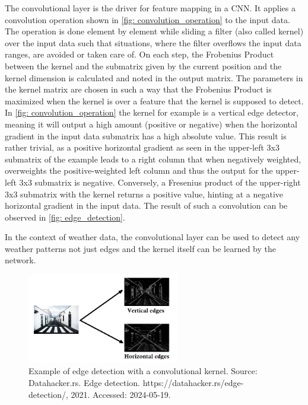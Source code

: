 The convolutional layer is the driver for feature mapping in a CNN. It applies a convolution operation shown in \autoref{fig: convolution_operation} to the input data. The operation is done element by element while sliding a filter (also called kernel) over the input data such that situations, where the filter overflows the input data ranges, are avoided or taken care of. On each step, the Frobenius Product between the kernel and the submatrix given by the current position and the kernel dimension is calculated and noted in the output matrix. The parameters in the kernel matrix are chosen in such a way that the Frobenius Product is maximized when the kernel is over a feature that the kernel is supposed to detect. In \autoref{fig: convolution_operation} the kernel for example is a vertical edge detector, meaning it will output a high amount (positive or negative) when the horizontal gradient in the input data submatrix has a high absolute value. This result is rather trivial, as a positive horizontal gradient as seen in the upper-left 3x3 submatrix of the example leads to a right column that when negatively weighted, overweights the positive-weighted left column and thus the output for the upper-left 3x3 submatrix is negative. Conversely, a Fresenius product of the upper-right 3x3 submatrix with the kernel returns a positive value, hinting at a negative horizontal gradient in the input data. The result of such a convolution can be observed in \autoref{fig: edge_detection}.

In the context of weather data, the convolutional layer can be used to detect any weather patterns not just edges and the kernel itself can be learned by the network.

\begin{figure}
    \centering
    \includegraphics[width=250px]{resources/images/edge_detection.jpeg}
    \caption{Example of edge detection with a convolutional kernel. Source: Datahacker.rs. Edge detection. https://datahacker.rs/edge-detection/, 2021.
    Accessed: 2024-05-19.}
    \label{fig: edge_detection}
\end{figure}

